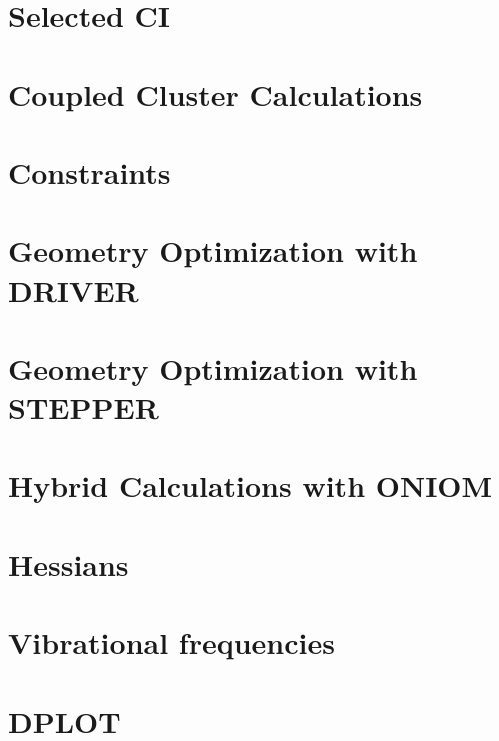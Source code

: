 \chapter{Selected CI}


\chapter{Coupled Cluster Calculations}


%


\chapter{Constraints}


\chapter{Geometry Optimization with DRIVER}


\chapter{Geometry Optimization with STEPPER}


\chapter{Hybrid Calculations with ONIOM}


\chapter{Hessians}


\chapter{Vibrational frequencies}


\chapter{DPLOT}



